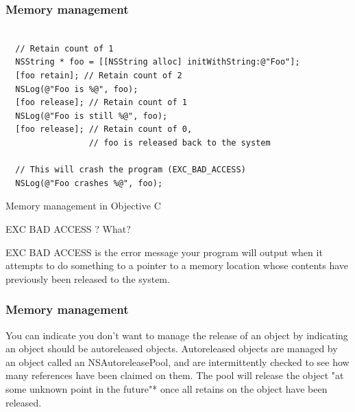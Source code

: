 \documentclass[10pt]{beamer}
\begin{document}
\begin{frame}[fragile]
  \frametitle{Memory management}
  \begin{listing}[H]
    \begin{verbatim}

  // Retain count of 1            
  NSString * foo = [[NSString alloc] initWithString:@"Foo"]; 
  [foo retain]; // Retain count of 2
  NSLog(@"Foo is %@", foo);
  [foo release]; // Retain count of 1
  NSLog(@"Foo is still %@", foo);
  [foo release]; // Retain count of 0,
                 // foo is released back to the system

  // This will crash the program (EXC_BAD_ACCESS)
  NSLog(@"Foo crashes %@", foo); 

  \end{verbatim}
    \caption{Memory management in Objective C}
    \label{listing:9}
  \end{listing}
\begin{block}{EXC BAD ACCESS ? What?}

  EXC BAD ACCESS is the error message your program will output when
  it attempts to do something to a pointer to a memory location
  whose contents have previously been released to the system.

  \end{block}

\end{frame}

\begin{frame}[fragile]
  \frametitle{Memory management}
  You can indicate you don't want to manage the release of an object by indicating an object should be autoreleased objects.  Autoreleased objects are managed by an object called an NSAutoreleasePool, and are intermittently checked to see how many references have been claimed on them.  The pool will release the object "at some unknown point in the future"* once all  retains on the object have been released.

\end{frame}
\end{document}
